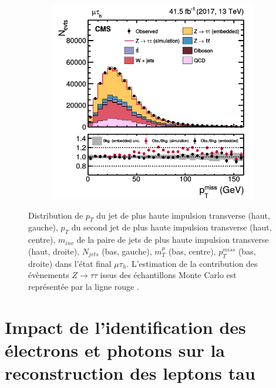 \begin{figure}[!ht]
\begin{subfigure}[b]{0.33\linewidth}
    \caption*{} 
    \vspace{0.5ex}
  \end{subfigure} 
    \begin{subfigure}[b]{0.33\linewidth}
    \centering
    \includegraphics[width=\linewidth]{Chapitre4/Images/ptmiss_embed.png} 
    \caption*{} 
    \vspace{0.5ex}
  \end{subfigure} 
  \caption{Distribution de $p_T$ du jet de plus haute impulsion transverse (haut, gauche), $p_T$ du second jet de plus haute impulsion transverse (haut, centre), $m_{inv}$ de la paire de jets de plus haute impulsion transverse (haut, droite), $N_{jets}$ (bas, gauche), $m_T^{\mu}$ (bas, centre), $p_T^{miss}$ (bas, droite) dans l'état final $\mu\tau_h$. L'estimation de la contribution des évènements $Z\rightarrow\tau\tau$ issus des échantillons Monte Carlo est représentée par la ligne rouge \cite{Embedding}.}
  \label{embedindata}
\end{figure}

\section{Impact de l'identification des électrons et photons sur la reconstruction des leptons tau}


